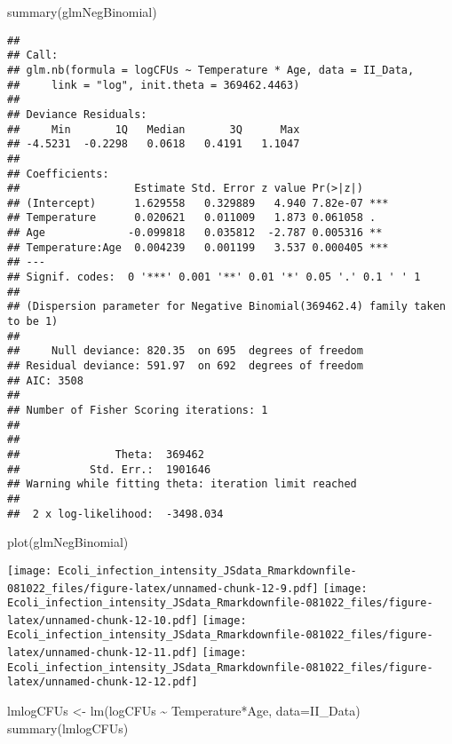 \documentclass[
]{article}
\newenvironment{Shaded}{\begin{snugshade}}{\end{snugshade}}
\newcommand{\AttributeTok}[1]{\textcolor[rgb]{0.77,0.63,0.00}{#1}}
\newcommand{\FunctionTok}[1]{\textcolor[rgb]{0.00,0.00,0.00}{#1}}
\newcommand{\NormalTok}[1]{#1}
\newcommand{\OtherTok}[1]{\textcolor[rgb]{0.56,0.35,0.01}{#1}}
\newcommand{\SpecialCharTok}[1]{\textcolor[rgb]{0.00,0.00,0.00}{#1}}
\begin{document}
\begin{Shaded}
\begin{Highlighting}[]
\FunctionTok{summary}\NormalTok{(glmNegBinomial)}
\end{Highlighting}
\end{Shaded}

\begin{verbatim}
## 
## Call:
## glm.nb(formula = logCFUs ~ Temperature * Age, data = II_Data, 
##     link = "log", init.theta = 369462.4463)
## 
## Deviance Residuals: 
##     Min       1Q   Median       3Q      Max  
## -4.5231  -0.2298   0.0618   0.4191   1.1047  
## 
## Coefficients:
##                  Estimate Std. Error z value Pr(>|z|)    
## (Intercept)      1.629558   0.329889   4.940 7.82e-07 ***
## Temperature      0.020621   0.011009   1.873 0.061058 .  
## Age             -0.099818   0.035812  -2.787 0.005316 ** 
## Temperature:Age  0.004239   0.001199   3.537 0.000405 ***
## ---
## Signif. codes:  0 '***' 0.001 '**' 0.01 '*' 0.05 '.' 0.1 ' ' 1
## 
## (Dispersion parameter for Negative Binomial(369462.4) family taken to be 1)
## 
##     Null deviance: 820.35  on 695  degrees of freedom
## Residual deviance: 591.97  on 692  degrees of freedom
## AIC: 3508
## 
## Number of Fisher Scoring iterations: 1
## 
## 
##               Theta:  369462 
##           Std. Err.:  1901646 
## Warning while fitting theta: iteration limit reached 
## 
##  2 x log-likelihood:  -3498.034
\end{verbatim}

\begin{Shaded}
\begin{Highlighting}[]
\FunctionTok{plot}\NormalTok{(glmNegBinomial)}
\end{Highlighting}
\end{Shaded}

\texttt{[image: Ecoli\_infection\_intensity\_JSdata\_Rmarkdownfile-081022\_files/figure-latex/unnamed-chunk-12-9.pdf]}
\texttt{[image: Ecoli\_infection\_intensity\_JSdata\_Rmarkdownfile-081022\_files/figure-latex/unnamed-chunk-12-10.pdf]}
\texttt{[image: Ecoli\_infection\_intensity\_JSdata\_Rmarkdownfile-081022\_files/figure-latex/unnamed-chunk-12-11.pdf]}
\texttt{[image: Ecoli\_infection\_intensity\_JSdata\_Rmarkdownfile-081022\_files/figure-latex/unnamed-chunk-12-12.pdf]}

\begin{Shaded}
\begin{Highlighting}[]
\NormalTok{lmlogCFUs }\OtherTok{\textless{}{-}} \FunctionTok{lm}\NormalTok{(logCFUs }\SpecialCharTok{\textasciitilde{}}\NormalTok{ Temperature}\SpecialCharTok{*}\NormalTok{Age, }\AttributeTok{data=}\NormalTok{II\_Data)}
\FunctionTok{summary}\NormalTok{(lmlogCFUs)}
\end{Highlighting}
\end{Shaded}
\end{document}
